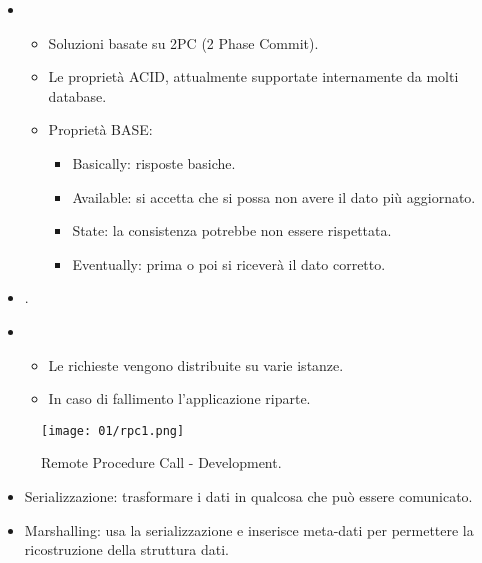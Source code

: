 \begin{itemize}
	\item {}
	      \begin{itemize}
		      \item Soluzioni basate su 2PC (2 Phase Commit).
		      \item Le proprietà ACID, attualmente supportate internamente da molti database.
		      \item Proprietà BASE:
		            \begin{itemize}
			            \item Basically: risposte basiche.
			            \item Available: si accetta che si possa non avere il dato più aggiornato.
			            \item State: la consistenza potrebbe non essere rispettata.
			            \item Eventually: prima o poi si riceverà il dato corretto.
		            \end{itemize}
	      \end{itemize}
	\item {}.
	\item {}
	      \begin{itemize}
		      \item Le richieste vengono distribuite su varie istanze.
		      \item In caso di fallimento l'applicazione riparte.
	      \end{itemize}
\end{itemize}


\begin{figure}[h]
	\centering
	\texttt{[image: 01/rpc1.png]}
	\caption{Remote Procedure Call - Development.}
\end{figure}

\begin{itemize}
	\item Serializzazione: trasformare i dati in qualcosa che può essere comunicato.
	\item Marshalling: usa la serializzazione e inserisce meta-dati per permettere la ricostruzione della struttura dati.
\end{itemize}

